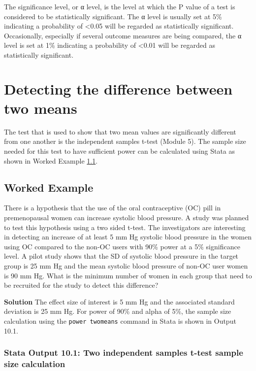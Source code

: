 \documentclass[
]{memoir}
\begin{document}
The significance level, or α level, is the level at which the P value of a test is considered to be statistically significant. The α level is usually set at 5\% indicating a probability of \textless0.05 will be regarded as statistically significant. Occasionally, especially if several outcome measures are being compared, the α level is set at 1\% indicating a probability of \textless0.01 will be regarded as statistically significant.

\hypertarget{detecting-the-difference-between-two-means}{%
\section{Detecting the difference between two means}\label{detecting-the-difference-between-two-means}}

The test that is used to show that two mean values are significantly different from one another is the independent samples t-test (Module 5). The sample size needed for this test to have sufficient power can be calculated using Stata as shown in Worked Example \ref{wex10-2}.

\hypertarget{wex10-2}{%
\subsection{Worked Example}\label{wex10-2}}

There is a hypothesis that the use of the oral contraceptive (OC) pill in premenopausal women can increase systolic blood pressure. A study was planned to test this hypothesis using a two sided t-test. The investigators are interesting in detecting an increase of at least 5 mm Hg systolic blood pressure in the women using OC compared to the non-OC users with 90\% power at a 5\% significance level. A pilot study shows that the SD of systolic blood pressure in the target group is 25 mm Hg and the mean systolic blood pressure of non-OC user women is 90 mm Hg. What is the minimum number of women in each group that need to be recruited for the study to detect this difference?

\textbf{Solution}
The effect size of interest is 5 mm Hg and the associated standard deviation is 25 mm Hg. For power of 90\% and alpha of 5\%, the sample size calculation using the \texttt{power\ twomeans} command in Stata is shown in Output 10.1.

\hypertarget{stata-output-10.1-two-independent-samples-t-test-sample-size-calculation}{%
\subsubsection*{Stata Output 10.1: Two independent samples t-test sample size calculation}\label{stata-output-10.1-two-independent-samples-t-test-sample-size-calculation}}
\end{document}
